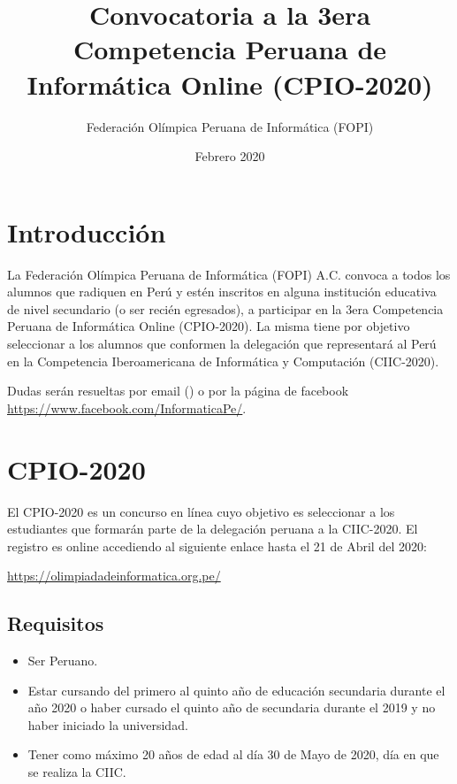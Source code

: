 \documentclass{article}
\title{Convocatoria a la 3era Competencia Peruana de Informática Online (CPIO-2020)
}
\author{Federación Olímpica Peruana de Informática (FOPI)}
\date{Febrero 2020}
\begin{document}
\maketitle

\section{Introducción}

La Federación Olímpica Peruana de Informática (FOPI) A.C. convoca a todos los alumnos que radiquen en Perú y estén inscritos en alguna institución educativa de nivel secundario (o ser recién egresados), a participar en la 3era Competencia Peruana de Informática Online (CPIO-2020). La misma tiene por objetivo seleccionar a los alumnos que conformen la delegación que representará al Perú en la Competencia Iberoamericana de Informática y Computación (CIIC-2020).

Dudas serán resueltas por email 
({\color{blue}{olimpiadaperuanainformatica@gmail.com})}
o por la página de facebook \url{https://www.facebook.com/InformaticaPe/}.



\section{CPIO-2020}

El CPIO-2020 es un concurso en línea cuyo objetivo
es seleccionar a los estudiantes que formarán parte de la delegación peruana a la CIIC-2020.
El registro es online accediendo al siguiente enlace
{\color{red} hasta el 21 de Abril del 2020}:

\begin{center}
\url{https://olimpiadadeinformatica.org.pe/}
\end{center}

\subsection{Requisitos}

\begin{itemize}
    \item Ser Peruano.
    \item Estar cursando del primero al quinto año de educación secundaria durante el año 2020 o haber cursado el quinto año de secundaria durante el 2019  y no haber iniciado la universidad.
    \item Tener como máximo 20 años de edad al día 30 de Mayo de 2020, día en que se realiza la CIIC.
\end{itemize}
\end{document}
